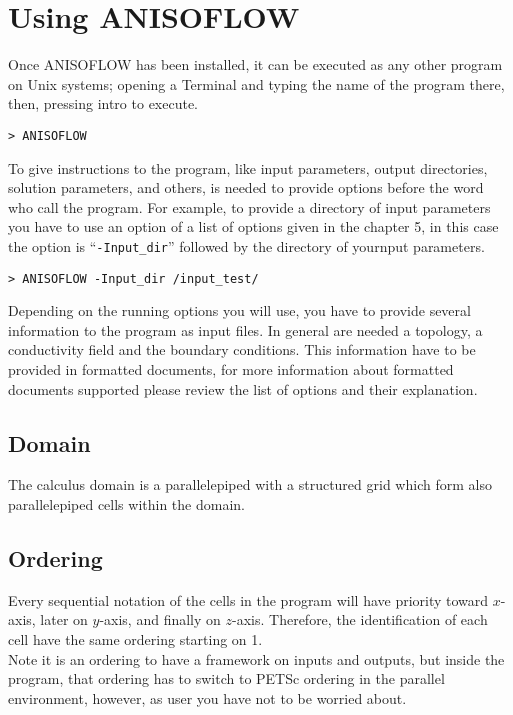\chapter{Using ANISOFLOW}

Once ANISOFLOW has been installed, it can be executed as any other program on Unix systems; opening a Terminal and typing the name of the program there, then, pressing intro to execute.
\begin{verbatim}
> ANISOFLOW
\end{verbatim}

To give instructions to the program, like input parameters, output directories, solution parameters, and others, is needed to provide options before the word who call the program. For example, to provide a directory of input parameters you have to use an option of a list of options given in the chapter 5, in this case the option is ``\texttt{-Input\_dir}'' followed by the directory of yournput parameters.
\begin{verbatim}
> ANISOFLOW -Input_dir /input_test/ 
\end{verbatim}

Depending on the running options you will use, you have to provide several information to the program as input files. In general are needed a topology, a conductivity field and the boundary conditions. This information have to be provided in formatted documents, for more information about formatted documents supported please review the list of options and their explanation.

\section{Domain}

The calculus domain is a parallelepiped with a structured grid which form also parallelepiped cells within the domain.

\section{Ordering}

Every sequential notation of the cells in the program will have priority toward $x$-axis, later on $y$-axis, and finally on $z$-axis. Therefore, the identification of each cell have the same ordering starting on 1.\\

Note it is an ordering to have a framework on inputs and outputs, but inside the program, that ordering has to switch to PETSc ordering in the parallel environment, however, as user you have not to be worried about.